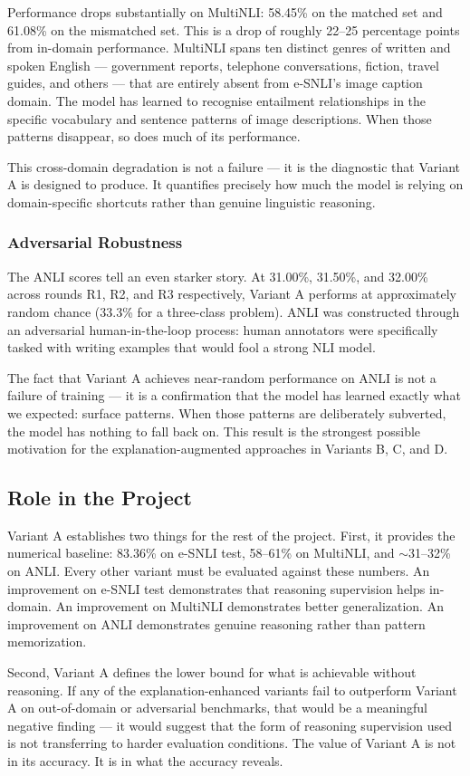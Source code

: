 Performance drops substantially on MultiNLI: 58.45\% on the matched
set and 61.08\% on the mismatched set. This is a drop of roughly
22--25 percentage points from in-domain performance. MultiNLI spans
ten distinct genres of written and spoken English --- government
reports, telephone conversations, fiction, travel guides, and others
--- that are entirely absent from e-SNLI's image caption domain. The
model has learned to recognise entailment relationships in the specific
vocabulary and sentence patterns of image descriptions. When those
patterns disappear, so does much of its performance.

This cross-domain degradation is not a failure --- it is the
diagnostic that Variant A is designed to produce. It quantifies
precisely how much the model is relying on domain-specific shortcuts
rather than genuine linguistic reasoning.

\subsubsection{Adversarial Robustness}

The ANLI scores tell an even starker story. At 31.00\%, 31.50\%, and
32.00\% across rounds R1, R2, and R3 respectively, Variant A performs
at approximately random chance (33.3\% for a three-class problem). ANLI
was constructed through an adversarial human-in-the-loop process: human
annotators were specifically tasked with writing examples that would
fool a strong NLI model.

The fact that Variant A achieves near-random performance on ANLI is not
a failure of training --- it is a confirmation that the model has
learned exactly what we expected: surface patterns. When those patterns
are deliberately subverted, the model has nothing to fall back on. This
result is the strongest possible motivation for the
explanation-augmented approaches in Variants B, C, and D.

\subsection{Role in the Project}

Variant A establishes two things for the rest of the project. First,
it provides the numerical baseline: 83.36\% on e-SNLI test, 58--61\%
on MultiNLI, and $\sim$31--32\% on ANLI. Every other variant must be
evaluated against these numbers. An improvement on e-SNLI test
demonstrates that reasoning supervision helps in-domain. An improvement
on MultiNLI demonstrates better generalization. An improvement on ANLI
demonstrates genuine reasoning rather than pattern memorization.

Second, Variant A defines the lower bound for what is achievable
without reasoning. If any of the explanation-enhanced variants fail to
outperform Variant A on out-of-domain or adversarial benchmarks, that
would be a meaningful negative finding --- it would suggest that the
form of reasoning supervision used is not transferring to harder
evaluation conditions. The value of Variant A is not in its accuracy.
It is in what the accuracy reveals.


